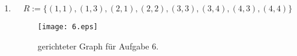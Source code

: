 \documentclass[a4paper]{article}
\begin{document}
\begin{enumerate}
		\item
		\begin{equation*}
			R := \{(1, 1), (1, 3), (2, 1), (2, 2), (3, 3), (3, 4), (4, 3), (4, 4)\}
		\end{equation*}	
		
		\begin{figure}[ht!]
			\begin{center}
				\texttt{[image: 6.eps]}
				\caption{gerichteter Graph für Aufgabe 6.}
			\end{center}
		\end{figure}
		
	\end{enumerate}
\end{document}
